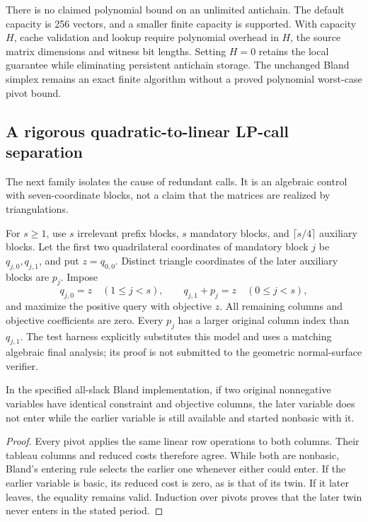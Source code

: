 There is no claimed polynomial bound on an unlimited antichain. The default
capacity is 256 vectors, and a smaller finite capacity is supported. With
capacity $H$, cache validation and lookup require polynomial overhead in
$H$, the source matrix dimensions and witness bit lengths. Setting
$H=0$ retains the local guarantee while eliminating persistent antichain
storage. The unchanged Bland simplex remains an exact finite algorithm
without a proved polynomial worst-case pivot bound.

\subsection{A rigorous quadratic-to-linear LP-call separation}

The next family isolates the cause of redundant calls. It is an algebraic
control with seven-coordinate blocks, not a claim that the matrices are
realized by triangulations.

For $s\ge1$, use $s$ irrelevant prefix blocks, $s$ mandatory blocks, and
$\lceil s/4\rceil$ auxiliary blocks. Let the first two quadrilateral
coordinates of mandatory block $j$ be $q_{j,0},q_{j,1}$, and put
$z=q_{0,0}$. Distinct triangle coordinates of the later auxiliary blocks
are $p_j$. Impose
\begin{equation}\label{eq:lp-family}
 q_{j,0}=z\quad(1\le j<s),\qquad q_{j,1}+p_j=z\quad(0\le j<s),
\end{equation}
and maximize the positive query with objective $z$. All remaining columns
and objective coefficients are zero. Every $p_j$ has a larger original
column index than $q_{j,1}$. The test harness explicitly substitutes this
model and uses a matching algebraic final analysis; its proof is not submitted
to the geometric normal-surface verifier.

\begin{lemma}\label{lem:duplicate}
In the specified all-slack Bland implementation, if two original nonnegative
variables have identical constraint and objective columns, the later variable
does not enter while the earlier variable is still available and started
nonbasic with it.
\end{lemma}
\begin{proof}
Every pivot applies the same linear row operations to both columns. Their
tableau columns and reduced costs therefore agree. While both are nonbasic,
Bland's entering rule selects the earlier one whenever either could enter.
If the earlier variable is basic, its reduced cost is zero, as is that of
its twin. If it later leaves, the equality remains valid. Induction over
pivots proves that the later twin never enters in the stated period.
\end{proof}

